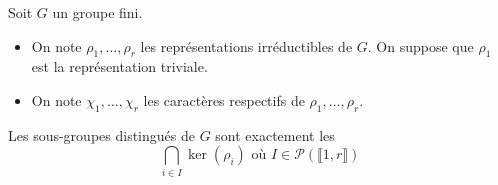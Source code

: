 






	Soit $G$ un groupe fini.

	\begin{notation}
		\begin{itemize}
			\item On note $\rho_1, \dots, \rho_r$ les représentations irréductibles de $G$. On suppose que $\rho_1$ est la représentation triviale.
			\item On note $\chi_1, \dots, \chi_r$ les caractères respectifs de $\rho_1, \dots, \rho_r$.
		\end{itemize}
	\end{notation}

	\begin{theorem}
		\label{sous-groupes-distingues-et-table-des-caracteres-1}
		Les sous-groupes distingués de $G$ sont exactement les
		\[ \bigcap_{i \in I} \ker(\rho_i) \text{ où } I \in \mathcal{P}(\llbracket 1, r \rrbracket) \]
	\end{theorem}

